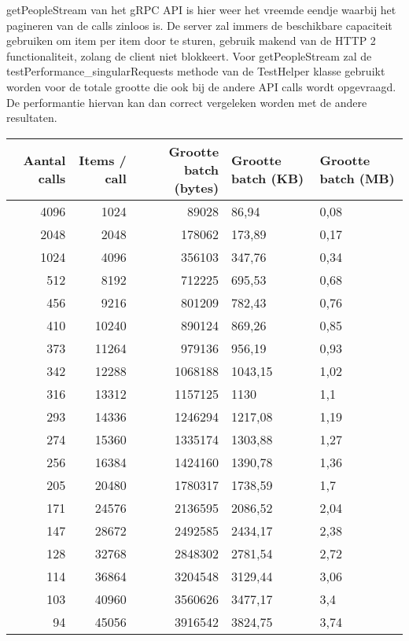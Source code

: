 getPeopleStream van het gRPC API is hier weer het vreemde eendje waarbij het pagineren van de calls zinloos is. De server zal immers de beschikbare capaciteit gebruiken
om item per item door te sturen, gebruik makend van de HTTP 2 functionaliteit, zolang de client niet blokkeert. Voor getPeopleStream zal de testPerformance\_singularRequests methode van
de TestHelper klasse gebruikt worden voor de totale grootte die ook bij de andere API calls wordt opgevraagd.
De performantie hiervan kan dan correct vergeleken worden met de andere resultaten.\\

\begin{table}
    \centering
    \begin{tabular}{rrrll}
        \toprule
        \textbf{Aantal calls} & \textbf{Items / call} & \textbf{Grootte batch (bytes)} & \textbf{Grootte batch (KB)} & \textbf{Grootte batch (MB)} \\
        \midrule
        4096 & 1024 & 89028 & 86,94 & 0,08 \\
        2048 & 2048 & 178062 & 173,89 & 0,17 \\
        1024 & 4096 & 356103 & 347,76 & 0,34 \\
        512 & 8192 & 712225 & 695,53 & 0,68 \\
        456 & 9216 & 801209 & 782,43 & 0,76 \\
        410 & 10240 & 890124 & 869,26 & 0,85 \\
        373 & 11264 & 979136 & 956,19 & 0,93 \\
        342 & 12288 & 1068188 & 1043,15 & 1,02 \\
        316 & 13312 & 1157125 & 1130 & 1,1 \\
        293 & 14336 & 1246294 & 1217,08 & 1,19 \\
        274 & 15360 & 1335174 & 1303,88 & 1,27 \\
        256 & 16384 & 1424160 & 1390,78 & 1,36 \\
        205 & 20480 & 1780317 & 1738,59 & 1,7 \\
        171 & 24576 & 2136595 & 2086,52 & 2,04 \\
        147 & 28672 & 2492585 & 2434,17 & 2,38 \\
        128 & 32768 & 2848302 & 2781,54 & 2,72 \\
        114 & 36864 & 3204548 & 3129,44 & 3,06 \\
        103 & 40960 & 3560626 & 3477,17 & 3,4 \\
        94 & 45056 & 3916542 & 3824,75 & 3,74 \\

\end{tabular}
\end{table}
